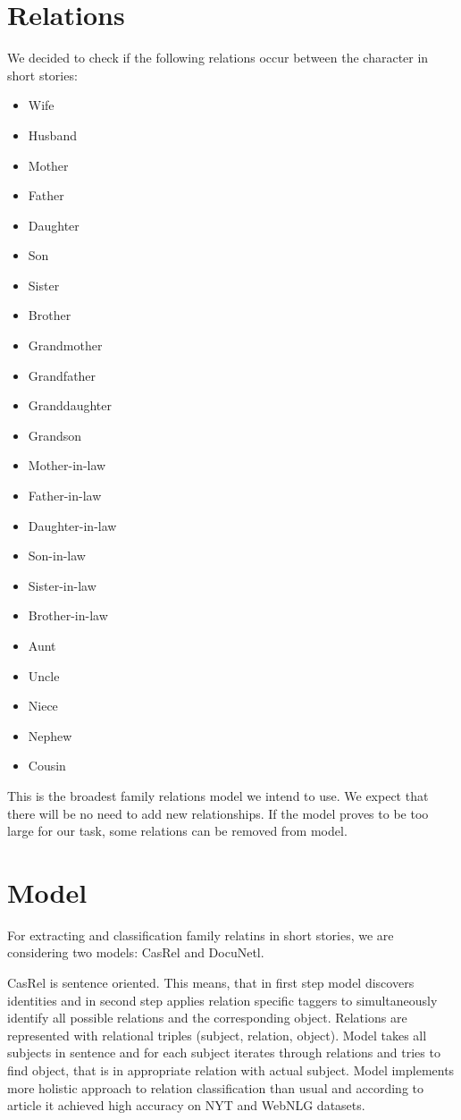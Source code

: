 \documentclass[fleqn,moreauthors,10pt]{ds_report}
\begin{document}
\section*{Relations}

We decided to check if the following relations occur between the character in short stories:
\begin{itemize}
\itemsep0em
\item Wife
\item Husband
\item Mother
\item Father
\item Daughter
\item Son
\item Sister
\item Brother
\item Grandmother
\item Grandfather
\item Granddaughter
\item Grandson
\item Mother-in-law
\item Father-in-law
\item Daughter-in-law
\item Son-in-law
\item Sister-in-law
\item Brother-in-law
\item Aunt
\item Uncle
\item Niece
\item Nephew
\item Cousin
\end{itemize}

This is the broadest family relations model we intend to use. We expect that there will be no need to add new relationships. If the model proves to be too large for our task, some relations can be removed from model.

\section*{Model}

For extracting and classification family relatins in short stories, we are considering two models: CasRel\cite{wei2020CasRel} and DocuNetl\cite{ijcai2021-551}.

CasRel is sentence oriented. This means, that in first step model discovers identities and in second step applies relation specific taggers to simultaneously identify all possible relations and the corresponding object. Relations are represented with relational triples (subject, relation, object). Model takes all subjects in sentence and for each subject iterates through relations and tries to find object, that is in appropriate relation with actual subject. Model implements more holistic approach to relation classification than usual and according to article\cite{wei2020CasRel} it achieved high accuracy on NYT and WebNLG datasets.
\end{document}
